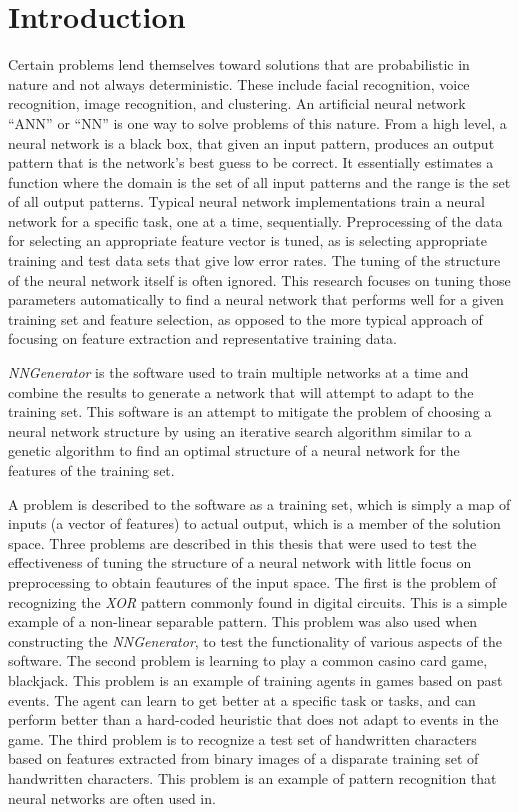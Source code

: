 \chapter[Introduction]{Introduction}
Certain problems lend themselves toward solutions that are probabilistic in nature and not always deterministic.
These include facial recognition, voice recognition, image recognition, and clustering. 
An artificial neural network ``ANN'' or ``NN'' is one way to solve problems of this nature. 
From a high level, a neural network is a black box, that given an input pattern, produces an output pattern that is the network's best guess to be correct. 
It essentially estimates a function where the domain is the set of all input patterns and the range is the set of all output patterns. 
Typical neural network implementations train a neural network for a specific task, one at a time, sequentially. 
Preprocessing of the data for selecting an appropriate feature vector is tuned, as is selecting appropriate training and test data sets that give low error rates. 
The tuning of the structure of the neural network itself is often ignored. 
This research focuses on tuning those parameters automatically to find a neural network that performs well for a given training set and feature selection, as opposed to the more typical approach of focusing on feature extraction and representative training data.

{\em NNGenerator} is the software used to train multiple networks at a time and combine the results to generate a network that will attempt to adapt to the training set. 
This software is an attempt to mitigate the problem of choosing a neural network structure by using an iterative search algorithm similar to a genetic algorithm to find an optimal structure of a neural network for the features of the training set. 

A problem is described to the software as a training set, which is simply a map of inputs (a vector of features) to actual output, which is a member of the solution space.
Three problems are described in this thesis that were used to test the effectiveness of tuning the structure of a neural network with little focus on preprocessing to obtain feautures of the input space. 
The first is the problem of recognizing the {\it XOR} pattern commonly found in digital circuits. 
This is a simple example of a non-linear separable pattern. 
This problem was also used when constructing the {\em NNGenerator}, to test the functionality of various aspects of the software. 
The second problem is learning to play a common casino card game, blackjack. 
This problem is an example of training agents in games based on past events. 
The agent can learn to get better at a specific task or tasks, and can perform better than a hard-coded heuristic that does not adapt to events in the game. 
The third problem is to recognize a test set of handwritten characters based on features extracted from binary images of a disparate training set of handwritten characters. 
This problem is an example of pattern recognition that neural networks are often used in.

